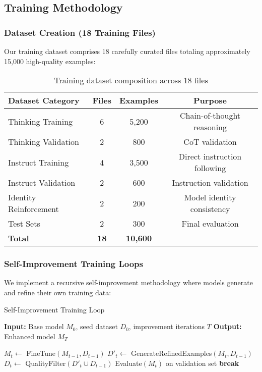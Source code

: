 \subsection{Training Methodology}

\subsubsection{Dataset Creation (18 Training Files)}
Our training dataset comprises 18 carefully curated files totaling approximately 15,000 high-quality examples:

\begin{table}[H]
\centering
\begin{tabular}{lccc}
\toprule
Dataset Category & Files & Examples & Purpose \\
\midrule
Thinking Training & 6 & 5,200 & Chain-of-thought reasoning \\
Thinking Validation & 2 & 800 & CoT validation \\
Instruct Training & 4 & 3,500 & Direct instruction following \\
Instruct Validation & 2 & 600 & Instruction validation \\
Identity Reinforcement & 2 & 200 & Model identity consistency \\
Test Sets & 2 & 300 & Final evaluation \\
\midrule
\textbf{Total} & \textbf{18} & \textbf{10,600} & \\
\bottomrule
\end{tabular}
\caption{Training dataset composition across 18 files}
\label{tab:dataset-files}
\end{table}

\subsubsection{Self-Improvement Training Loops}
We implement a recursive self-improvement methodology where models generate and refine their own training data:

\begin{algorithm}[H]
\caption{Self-Improvement Training Loop}
\label{alg:self-improvement}
\begin{algorithmic}[1]
\STATE \textbf{Input:} Base model $M_0$, seed dataset $D_0$, improvement iterations $T$
\STATE \textbf{Output:} Enhanced model $M_T$

    \STATE $M_t \leftarrow$ FineTune$(M_{t-1}, D_{t-1})$
    \STATE $D'_t \leftarrow$ GenerateRefinedExamples$(M_t, D_{t-1})$
    \STATE $D_t \leftarrow$ QualityFilter$(D'_t \cup D_{t-1})$
    \STATE Evaluate$(M_t)$ on validation set
        \STATE \textbf{break}
    \ENDIF
\ENDFOR
\end{algorithmic}
\end{algorithm}

